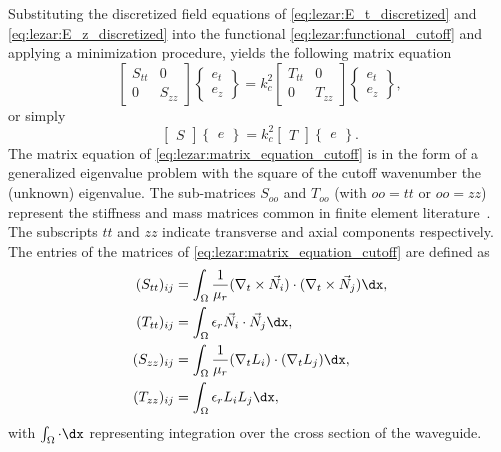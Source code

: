 Substituting the discretized field equations of
\eqref{eq:lezar:E_t_discretized} and \eqref{eq:lezar:E_z_discretized}
into the functional \eqref{eq:lezar:functional_cutoff} and
applying a minimization procedure, yields the following matrix
equation~\citep{Davidson2011}
\begin{equation}
    \label{eq:lezar:matrix_equation_cutoff}
    \begin{bmatrix}
      S_{tt} & 0\\0 & S_{zz}
    \end{bmatrix}
    \begin{Bmatrix}
    e_t
    \\
    e_z
    \end{Bmatrix}
  = k_c^2
    \begin{bmatrix}T_{tt} & 0
    \\
    0 &   T_{zz}\end{bmatrix}
    \begin{Bmatrix}
        e_t
      \\
      e_z
    \end{Bmatrix},
\end{equation}
or simply
\begin{equation}
  \begin{bmatrix}
      S
  \end{bmatrix}
  \begin{Bmatrix}
      e
    \end{Bmatrix}
  =
    k_c^2
    \begin{bmatrix}
      T
    \end{bmatrix}
    \begin{Bmatrix}
      e
    \end{Bmatrix}.
\end{equation}
The matrix equation of \eqref{eq:lezar:matrix_equation_cutoff}
is in the form of a generalized eigenvalue problem with the
square of the cutoff wavenumber the (unknown) eigenvalue. The
sub-matrices $S_{oo}$ and $T_{oo}$ (with $oo = tt$ or $oo = zz$)
represent the stiffness and mass matrices common in finite element
literature~\citep{Davidson2011, Jin2002}. The subscripts $tt$ and $zz$
indicate transverse and axial components respectively. The entries of
the matrices of \eqref{eq:lezar:matrix_equation_cutoff} are defined
as \citep{PelosiCoccioliSelleri1998, Jin2002}
\begin{align}
\label{eq:lezar:S_tt_ij}
(S_{tt})_{ij} &= \int_\Omega \frac{1}{\mu_r}(\nabla_t\times\vec{N}_i)\cdot(\nabla_t\times\vec{N}_j) \dx,\\
\label{eq:lezar:T_tt_ij}
(T_{tt})_{ij} &= \int_\Omega \epsilon_r\vec{N}_i\cdot\vec{N}_j \dx,\\
\label{eq:lezar:S_zz_ij}
(S_{zz})_{ij} &= \int_\Omega \frac{1}{\mu_r}(\nabla_t L_i)\cdot(\nabla_t L_j) \dx,\\
\label{eq:lezar:T_zz_ij}
(T_{zz})_{ij} &= \int_\Omega \epsilon_r L_i L_j \dx,
\end{align}
with $\int_\Omega\cdot \dx$ representing integration over the cross
section of the waveguide.

